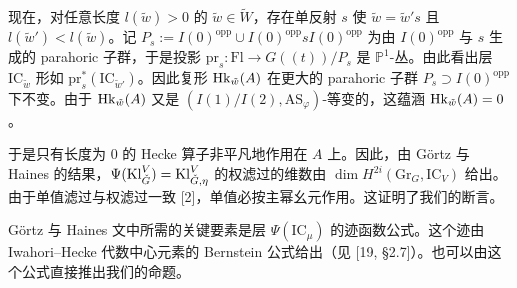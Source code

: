 现在，对任意长度 $l(\tilde w)>0$ 的 $\tilde w\in\widetilde W$，存在单反射 $s$ 使 $\tilde w=\tilde w's$ 且 $l(\tilde w')<l(\tilde w)$。记 $P_s:=I(0)^{\mathrm{opp}}\cup I(0)^{\mathrm{opp}}sI(0)^{\mathrm{opp}}$ 为由 $I(0)^{\mathrm{opp}}$ 与 $s$ 生成的 parahoric 子群，于是投影 $\mathrm{pr}_s:\mathrm{Fl}\to G((t))/P_s$ 是 $\mathbb{P}^1$-丛。由此看出层 $\mathrm{IC}_{\tilde w}$ 形如 $\mathrm{pr}_s^*(\mathrm{IC}_{\tilde w'})$。因此复形 $\mathrm{Hk}_{\tilde w}(A)$ 在更大的 parahoric 子群 $P_s\supset I(0)^{\mathrm{opp}}$ 下不变。由于 $\mathrm{Hk}_{\tilde w}(A)$ 又是 $(I(1)/I(2),\mathrm{AS}_\varphi)$-等变的，这蕴涵 $\mathrm{Hk}_{\tilde w}(A)=0$。

于是只有长度为 $0$ 的 Hecke 算子非平凡地作用在 $A$ 上。因此，由 Görtz 与 Haines 的结果，$\Psi(\mathrm{Kl}^V_{\check G})=\mathrm{Kl}^V_{\check G,\eta}$ 的权滤过的维数由 $\dim H^{2i}(\mathrm{Gr}_G,\mathrm{IC}_V)$ 给出。由于单值滤过与权滤过一致 [2]，单值必按主幂幺元作用。这证明了我们的断言。

\begin{remark}
Görtz 与 Haines 文中所需的关键要素是层 $\Psi(\mathrm{IC}_\mu)$ 的迹函数公式。这个迹由 Iwahori--Hecke 代数中心元素的 Bernstein 公式给出（见 [19, §2.7]）。也可以由这个公式直接推出我们的命题。
\end{remark}
